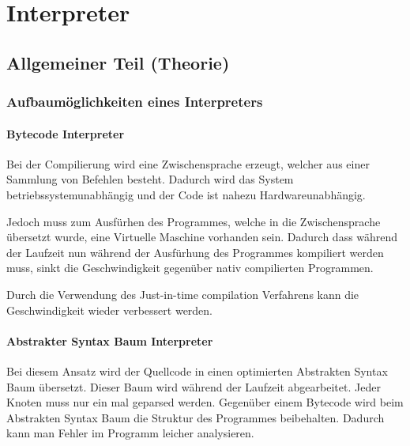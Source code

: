 

\chapter{Interpreter}


\section{Allgemeiner Teil (Theorie)}

\subsection{Aufbaumöglichkeiten eines Interpreters}

\subsubsection{Bytecode Interpreter}
Bei der Compilierung wird eine Zwischensprache erzeugt, welcher aus einer Sammlung von Befehlen besteht. Dadurch wird das System
betriebssystemunabhängig und der Code ist nahezu Hardwareunabhängig.

Jedoch muss zum Ausfürhen des Programmes, welche in die Zwischensprache übersetzt wurde, eine Virtuelle Maschine vorhanden sein.
Dadurch dass während der Laufzeit nun während der Ausfürhung des Programmes kompiliert werden muss, sinkt die Geschwindigkeit gegenüber
nativ compilierten Programmen.

Durch die Verwendung des Just-in-time compilation Verfahrens kann die Geschwindigkeit wieder verbessert werden.

\subsubsection{Abstrakter Syntax Baum Interpreter}
Bei diesem Ansatz wird der Quellcode in einen optimierten Abstrakten Syntax Baum übersetzt. Dieser Baum wird während der Laufzeit
abgearbeitet. Jeder Knoten muss nur ein mal geparsed werden. Gegenüber einem Bytecode wird beim Abstrakten Syntax Baum die Struktur
des Programmes beibehalten. Dadurch kann man Fehler im Programm leicher analysieren.


